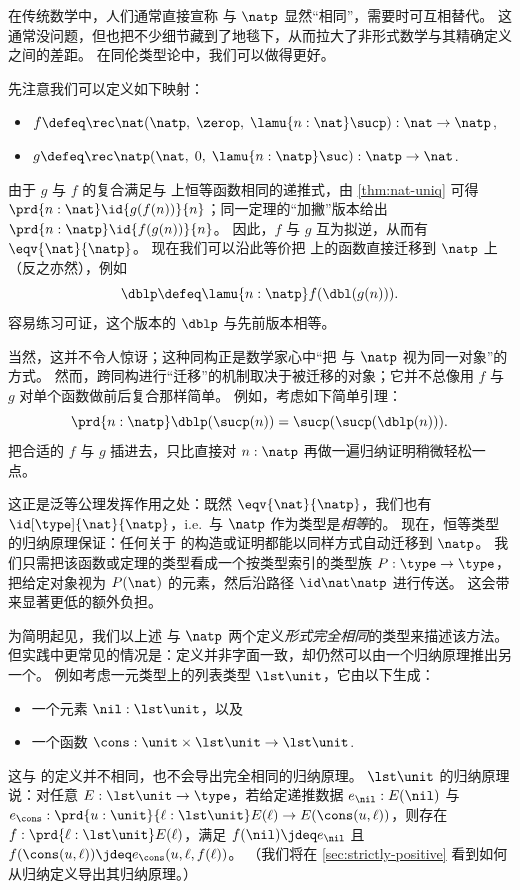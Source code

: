 在传统数学中，人们通常直接宣称 \nat 与 $\natp$ 显然“相同”，需要时可互相替代。
这通常没问题，但也把不少细节藏到了地毯下，从而拉大了非形式数学与其精确定义之间的差距。
在同伦类型论中，我们可以做得更好。

先注意我们可以定义如下映射：
\begin{itemize}
\item $f \defeq \rec\nat(\natp, \; \zerop, \;  \lamu{n:\nat} \sucp)
       : \nat \to\natp$,
\item $g \defeq \rec\natp(\nat, \; 0, \;  \lamu{n:\natp} \suc)
       : \natp \to\nat$.
\end{itemize}
由于 $g$ 与 $f$ 的复合满足与 \nat 上恒等函数相同的递推式，由 \cref{thm:nat-uniq} 可得 $\prd{n : \nat} \id{g(f(n))}{n}$；同一定理的“加撇”版本给出 $\prd{n : \natp} \id{f(g(n))}{n}$。
因此，$f$ 与 $g$ 互为拟逆，从而有 $\eqv{\nat}{\natp}$。
现在我们可以沿此等价把 \nat 上的函数直接迁移到 $\natp$ 上（反之亦然），例如
\[ \dblp \defeq \lamu{n:\natp} f(\dbl(g(n))). \]
容易练习可证，这个版本的 $\dblp$ 与先前版本相等。

当然，这并不令人惊讶；这种同构正是数学家心中“把 \nat 与 $\natp$ 视为同一对象”的方式。
然而，跨同构进行“迁移”的机制取决于被迁移的对象；它并不总像用 $f$ 与 $g$ 对单个函数做前后复合那样简单。
例如，考虑如下简单引理：
\[\prd{n : \natp} \dblp(\sucp(n))=\sucp(\sucp(\dblp(n))).\]
把合适的 $f$ 与 $g$ 插进去，只比直接对 $n:\natp$ 再做一遍归纳证明稍微轻松一点。
%

%
这正是泛等公理发挥作用之处：既然 $\eqv{\nat}{\natp}$，我们也有 $\id[\type]{\nat}{\natp}$，i.e.\ \nat 与 $\natp$ 作为类型是\emph{相等}的。
现在，恒等类型的归纳原理保证：任何关于 \nat 的构造或证明都能以同样方式自动迁移到 $\natp$。
我们只需把该函数或定理的类型看成一个按类型索引的类型族 $P:\type\to\type$，把给定对象视为 $P(\nat)$ 的元素，然后沿路径 $\id \nat\natp$ 进行传送。
这会带来显著更低的额外负担。

为简明起见，我们以上述 \nat 与 $\natp$ 两个定义\emph{形式完全相同}的类型来描述该方法。
但实践中更常见的情况是：定义并非字面一致，却仍然可以由一个归纳原理推出另一个。
%
%
例如考虑一元类型上的列表类型 $\lst\unit$，它由以下生成：
\begin{itemize}
\item 一个元素 $\nil:\lst\unit$，以及
\item 一个函数 $\cons:\unit \times \lst\unit \to\lst\unit$.
\end{itemize}
这与 \nat 的定义并不相同，也不会导出完全相同的归纳原理。
$\lst\unit$ 的归纳原理说：对任意 $E:\lst\unit\to\type$，若给定递推数据 $e_\nil:E(\nil)$ 与 $e_\cons : \prd{u:\unit}{\ell:\lst\unit} E(\ell) \to E(\cons(u,\ell))$，则存在 $f:\prd{\ell:\lst\unit} E(\ell)$，满足 $f(\nil)\jdeq e_\nil$ 且 $f(\cons(u,\ell))\jdeq e_\cons(u,\ell,f(\ell))$。
（我们将在 \cref{sec:strictly-positive} 看到如何从归纳定义导出其归纳原理。）

